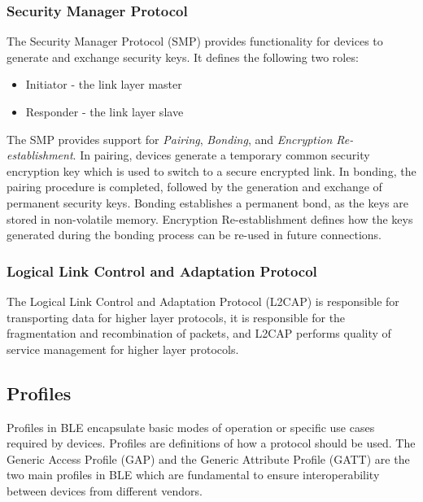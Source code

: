         \subsubsection{Security Manager Protocol}
    The Security Manager Protocol (SMP) provides functionality for devices
    to generate and exchange security keys. It defines the following two roles:
    \begin{itemize}
      \item Initiator - the link layer master
      \item Responder - the link layer slave
    \end{itemize}
    The SMP provides support for \textit{Pairing}, \textit{Bonding}, and
    \textit{Encryption Re-establishment}.
    In pairing, devices generate a temporary common security encryption key which is
    used to switch to a secure encrypted link. In bonding, the pairing procedure
    is completed, followed by the generation and exchange of permanent security
    keys. Bonding establishes a permanent bond, as the keys are stored in non-volatile
    memory. Encryption Re-establishment defines how the keys generated during
    the bonding process can be re-used in future connections.

        \subsubsection{Logical Link Control and Adaptation Protocol}
    The Logical Link Control and Adaptation Protocol (L2CAP) is responsible for
    transporting data for higher layer protocols, it is responsible for the
    fragmentation and recombination of packets, and L2CAP performs quality of service
    management for higher layer protocols.

      \subsection{Profiles} \label{profiles}
    Profiles in BLE encapsulate basic modes of operation or specific use cases
    required by devices. Profiles are definitions of how a protocol should be
    used. The Generic Access Profile (GAP) and the Generic Attribute Profile (GATT)
    are the two main profiles in BLE which are fundamental to ensure interoperability
    between devices from different vendors.

